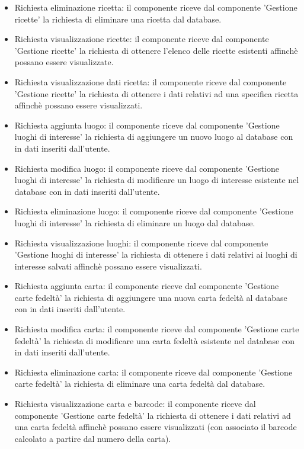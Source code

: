 \documentclass[a4paper,12pt]{article}
\begin{document}
\begin{itemize}
\item {\sffamily Richiesta eliminazione ricetta}: il componente riceve dal componente 'Gestione ricette' la richiesta di eliminare una ricetta dal database.
\item {\sffamily Richiesta visualizzazione ricette}: il componente riceve dal componente 'Gestione ricette' la richiesta di ottenere l'elenco delle ricette esistenti affinchè possano essere visualizzate.
\item {\sffamily Richiesta visualizzazione dati ricetta}: il componente riceve dal componente 'Gestione ricette' la richiesta di ottenere i dati relativi ad una specifica ricetta affinchè possano essere visualizzati.
\item {\sffamily Richiesta aggiunta luogo}: il componente riceve dal componente 'Gestione luoghi di interesse' la richiesta di aggiungere un nuovo luogo al database con in dati inseriti dall'utente.
\item {\sffamily Richiesta modifica luogo}: il componente riceve dal componente 'Gestione luoghi di interesse' la richiesta di modificare un luogo di interesse esistente nel database con in dati inseriti dall'utente.
\item {\sffamily Richiesta eliminazione luogo}: il componente riceve dal componente 'Gestione luoghi di interesse' la richiesta di eliminare un luogo dal database.
\item {\sffamily Richiesta visualizzazione luoghi}:  il componente riceve dal componente 'Gestione luoghi di interesse' la richiesta di ottenere i dati relativi ai luoghi di interesse salvati affinchè possano essere visualizzati.
\item {\sffamily Richiesta aggiunta carta}: il componente riceve dal componente 'Gestione carte fedeltà' la richiesta di aggiungere una nuova carta fedeltà al database con in dati inseriti dall'utente.
\item {\sffamily Richiesta modifica carta}: il componente riceve dal componente 'Gestione carte fedeltà' la richiesta di modificare una carta fedeltà esistente nel database con in dati inseriti dall'utente.
\item {\sffamily Richiesta eliminazione carta}: il componente riceve dal componente 'Gestione carte fedeltà' la richiesta di eliminare una carta fedeltà dal database.
\item {\sffamily Richiesta visualizzazione carta e barcode}: il componente riceve dal componente 'Gestione carte fedeltà' la richiesta di ottenere i dati relativi ad una carta fedeltà affinchè possano essere visualizzati (con associato il barcode calcolato a partire dal numero della carta).

\end{itemize}
\end{document}
